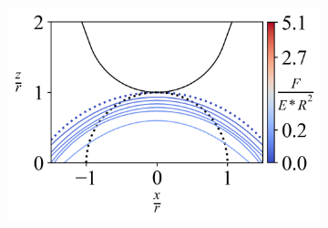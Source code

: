\begin{figure}[H]
\begin{subfigure}{0.32\textwidth}
        \includegraphics[width=1\linewidth]{Figures/Hemisphere-LineContour-5.png}
    \end{subfigure}   



    \hfill
    \vspace{-0.3in}
    
    
    

\end{figure}
